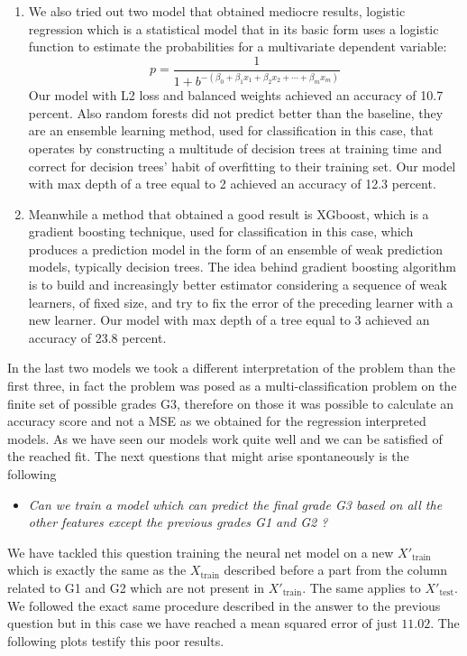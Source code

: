 \documentclass[a4paper, 11pt]{report}
\theoremstyle{definition}
\numberwithin{equation}{section}		%
\numberwithin{table}{section}				%
\begin{document}
\begin{enumerate}
\item We also tried out two model that obtained mediocre results, logistic regression which is a statistical model that in its basic form uses a logistic function to estimate the probabilities for a multivariate dependent variable: $$p=\frac{1}{1+b^{-\left(\beta_{0}+\beta_{1} x_{1}+\beta_{2} x_{2}+\cdots+\beta_{m} x_{m}\right)}}$$
Our model with L2 loss and balanced weights achieved an accuracy of 10.7 percent. Also random forests did not predict better than the baseline, they are an ensemble learning method, used for classification in this case, that operates by constructing a multitude of decision trees at training time and correct for decision trees' habit of overfitting to their training set. Our model with max depth of a tree equal to 2 achieved an accuracy of 12.3 percent.
\item Meanwhile a method that obtained a good result is XGboost, which is a gradient boosting technique, used for classification in this case, which produces a prediction model in the form of an ensemble of weak prediction models, typically decision trees. The idea behind gradient boosting algorithm is to build and increasingly better estimator considering a sequence of weak learners, of fixed size, and try to fix the error of the preceding learner with a new learner. Our model with max depth of a tree equal to 3 achieved an accuracy of 23.8 percent.
\end{enumerate}
In the last two models we took a different interpretation of the problem than the first three, in fact the problem was posed as a multi-classification problem on the finite set of possible grades G3, therefore on those it was possible to calculate an accuracy score and not a MSE as we obtained for the regression interpreted models.
As we have seen our models work quite well and we can be satisfied of the reached fit. The next questions that might arise spontaneously is the following
\begin{itemize}
    \item \textit{Can we train a model which can predict the final grade G3 based on all the other features except the previous grades G1 and G2 ?}
\end{itemize}
We have tackled this question training the neural net model on a new $X'_{\text{train}}$ which is exactly the same as the $X_{\text{train}}$ described before a part from the column related to G1 and G2 which are not present in $X'_{\text{train}}$. The same applies to $X'_{\text{test}}$. We followed the exact same procedure described in the answer to the previous question but in this case we have reached a mean squared error of just $11.02$. The following plots testify this poor results.
\end{document}
